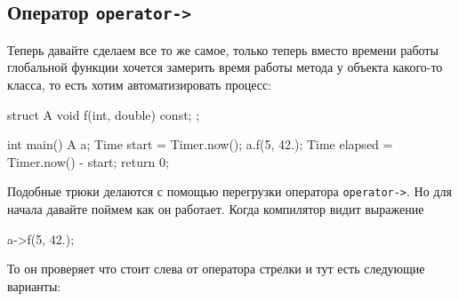 \subsection{Оператор \texttt{operator->}}

Теперь давайте сделаем все то же самое, только теперь вместо времени работы глобальной функции хочется замерить время работы метода у объекта какого-то класса, то есть хотим автоматизировать процесс:
\begin{cppcode}
struct A {
  void f(int, double) const;
};

int main() {
  A a;
  Time start = Timer.now();
  a.f(5, 42.);
  Time elapsed = Timer.now() - start;
  return 0;
}
\end{cppcode}
Подобные трюки делаются с помощью перегрузки оператора \verb"operator->".
Но для начала давайте поймем как он работает.
Когда компилятор видит выражение
\begin{cppcode}
a->f(5, 42.);
\end{cppcode}
То он проверяет что стоит слева от оператора стрелки и тут есть следующие варианты:
